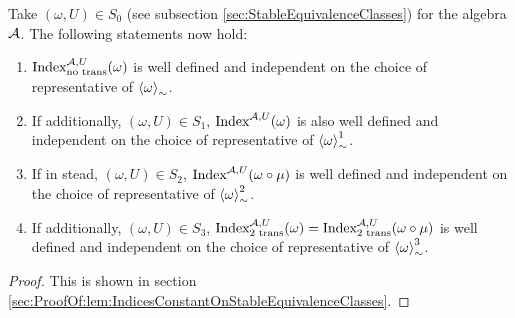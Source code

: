 \documentclass[11pt,a4paper,twoside]{article}
\numberwithin{equation}{section}
\begin{document}
	\begin{theorem}\label{lem:IndicesConstantOnStableEquivalenceClasses}
		Take $(\omega,U)\in S_0$ (see subsection \ref{sec:StableEquivalenceClasses}) for the algebra $\AA$. The following statements now hold:
		\begin{enumerate}
			\item $\textrm{Index}^{\AA,U}_{\text{no trans}}(\omega)$ is well defined and independent on the choice of representative of $\expval{\omega}_\sim$.
			\item If additionally, $(\omega,U)\in S_1$, $\textrm{Index}^{\AA,U}(\omega)$ is also well defined and independent on the choice of representative of $\expval{\omega}_\sim^1$.
			\item If in stead, $(\omega,U)\in S_2$, $\textrm{Index}^{\AA,U}(\omega\circ\mu)$ is well defined and independent on the choice of representative of $\expval{\omega}_\sim^2$.
			\item If additionally, $(\omega,U)\in S_3$, $\textrm{Index}^{\AA,U}_{\textrm{2 trans}}(\omega)=\textrm{Index}^{\AA,U}_{\textrm{2 trans}}(\omega\circ\mu)$ is well defined and independent on the choice of representative of $\expval{\omega}_\sim^3$.
		\end{enumerate}
	\end{theorem}
	\begin{proof}
		This is shown in section \ref{sec:ProofOf:lem:IndicesConstantOnStableEquivalenceClasses}.
	\end{proof}
\end{document}

